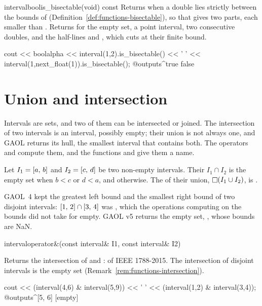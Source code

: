\documentclass[12pt,a4paper,twoside,openright]{book}
\begin{document}
\begin{defmethod}{interval}{bool}{is\_bisectable}{(void) const}
  Returns  when a double lies strictly between the bounds of
   (Definition~\ref{def:functions-bisectable}), so that
   gives two parts, each smaller than . Returns
   for the empty set, a point interval, two consecutive
  doubles, and the half-lines  and
  , which  cuts at their finite
  bound.\newinvfive
  \begin{example}
cout << boolalpha << interval(1,2).is_bisectable() << ' '
     << interval(1,next_float(1)).is_bisectable();
@outputs^true false~
  \end{example}
\end{defmethod}

\section{Union and intersection}\label{sec:functions-union}
%

Intervals are sets, and two of them can be intersected or joined. The
intersection of two intervals is an interval, possibly empty; their union
is not always one, and GAOL returns its hull, the smallest interval that
contains both. The operators \code{\&} and \code{|} compute them, and the
functions  and  give them a name.

\begin{Def}\label{def:functions-hull}
Let $I_1=[a,\,b]$ and $I_2=[c,\,d]$ be two non-empty intervals. Their
 $I_1\cap I_2$ is the empty set when $b<c$ or $d<a$, and
 otherwise. The  of their union,
$\mathop{\Box} (I_1\cup I_2)$, is .
\end{Def}

\begin{Rem}\label{rem:functions-intersection}
GAOL~4 kept the greatest left bound and the smallest right bound of two
disjoint intervals: $[1,\,2]\cap[3,\,4]$ was , which the
operations computing on the bounds did not take for empty. GAOL v5 returns
the empty set, , whose bounds are
NaN.\newinvfive
\end{Rem}

\begin{deffun}{interval}{operator\&}{(const interval\& I1, const interval\& I2)}
  \begin{operation}
  \end{operation}
  Returns the intersection of  and :  of
  IEEE 1788-2015. The intersection of disjoint intervals is the empty set
   (Remark~\ref{rem:functions-intersection}).
  \begin{example}
cout << (interval(4,6) & interval(5,9)) << ' '
     << (interval(1,2) & interval(3,4));
@outputs^[5, 6] [empty]~
  \end{example}
\end{deffun}
\end{document}
